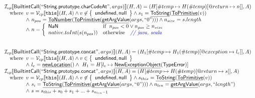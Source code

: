 \documentclass{article}
\makeatletter
\newcommand{\SF}[1]{\mbox{\textsf{#1}}}
\newcommand{\TT}[1]{\mbox{\texttt{#1}}}
\newcommand{\comment}[1]{\textit{#1}}
\newcommand{\wherec}[1]{{\rm where}\begin{array}[t]{l}#1\end{array}}
\newcommand{\ifc}[1]{{\rm if}\begin{array}[t]{l}#1\end{array}}
\newcommand{\owc}{{\rm otherwise}}
\newcommand{\I}{\mathcal{I}}
\newcommand{\V}{\mathcal{V}}
\newcommand{\set}[1]{\left\{\begin{array}{l}#1\end{array}\right\}}
\newcommand{\lbr}{\llbracket}
\newcommand{\rbr}{\rrbracket}
\newcommand{\hf}[1]{\underline{\sf #1}}
\newcommand{\varloc}[1]{\##1}
\newcommand{\varprop}[1]{@#1}
\def\inblue{\color{blue}}
\def\inblue{\color{blue}}
\makeatother
\begin{document}
\[\begin{array}{l}
\I _{cp}\lbr \SF{BuiltintCall}(``\SF{String.prototype.charCodeAt}",args)\rbr(H,A)
 = (H[\varloc{temp}\mapsto H(\varloc{temp})[\varprop{return}\mapsto n]], A) \\
\quad\wherec{
  v = \V _{cp}\lbr \TT{this}\rbr (H,A) \land v \not\in \set{\SF{undefined}, \SF{null}}
  \land s_1 = \hf{ToString}(\hf{ToPrimitive}(v))\\
  \land\ n_{pos} = \hf{ToNumber}(\hf{ToPrimitive}(\hf{getArgValue}(args, ``0"))) \land n_{size} = s.length\\
  \land\ n = \left\{\begin{array}{ll}
      \SF{NaN} & \ifc{n_{pos} < 0 \lor n_{pos} \geq n_{size}}\\
     native.toInt(s(n_{pos})) & \owc\quad\comment{{\inblue // java, scala}}\\
    \end{array}\right.
  }\\
\\\\

\I _{cp}\lbr \SF{BuiltintCall}(``\SF{String.prototype.concat}",args)\rbr(H,A)
 = (H_1[\varloc{temp}\mapsto H_1(\varloc{temp})[\varprop{exception}\mapsto l_e]], A) \\
\quad\wherec{
  v = \V _{cp}\lbr \TT{this}\rbr (H,A) \land v \in \set{\SF{undefined}, \SF{null}}\\
  \land\ l_e = \hf{newLocation}() \land\ H_1=H[l_e\mapsto\hf{NewExceptionObject}(\SF{TypeError})] 
  }\\
  
\I _{cp}\lbr \SF{BuiltintCall}(``\SF{String.prototype.concat}",args)\rbr(H,A)
 = (H[\varloc{temp}\mapsto H(\varloc{temp})[\varprop{return}\mapsto s]], A) \\
\quad\wherec{
  v = \V _{cp}\lbr \TT{this}\rbr (H,A) \land v \not\in \set{\SF{undefined}, \SF{null}}
  \land s_{this} = \hf{ToString}(\hf{ToPrimitive}(v))\\
  \land\ s_{i} = \hf{ToString}(\hf{ToPrimitive}(\hf{getArgValue}(args, ``0")))
  \land n_{len} = \hf{getArgValue}(args, ``length")\\
  \land\ s = s_{this} + s_0 + s_1 + ... + s_{n_{len}-1}
  }\\
\\\\
\end{array}
\]
\end{document}

